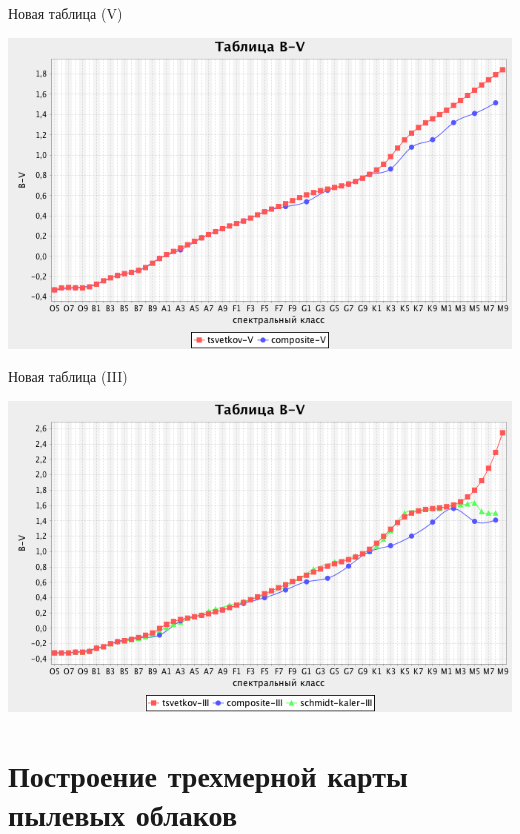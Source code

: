 \documentclass[14pt, fleqn, xcolor={dvipsnames, table}]{beamer}
\begin{document}
        \begin{frame}{Новая таблица (V)}
            \begin{center}
			    \includegraphics[scale=0.49]{table-compositeV.png}
            \end{center}
        \end{frame} 
        
        \begin{frame}{Новая таблица (III)}
            \begin{center}
			    \includegraphics[scale=0.49]{table-compositeIII.png}
            \end{center}
        \end{frame} 
        
    \section{Построение трехмерной карты пылевых облаков}          
        
\end{document}
